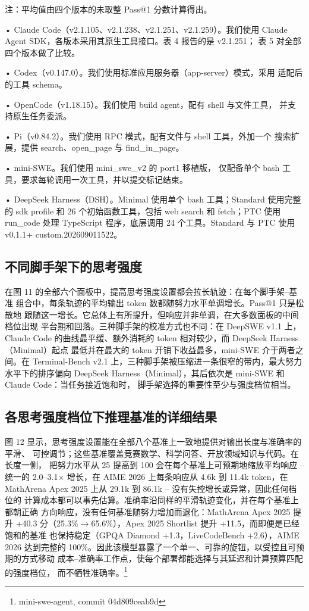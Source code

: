 \documentclass[
  10
]{article}
\begin{document}
注：平均值由四个版本的未取整 Pass@1 分数计算得出。

• Claude Code（v2.1.105、v2.1.238、v2.1.251、v2.1.259）。我们使用
Claude Agent SDK，各版本采用其原生工具接口。表 4 报告的是 v2.1.251；
表 5 对全部四个版本做了比较。

• Codex（v0.147.0）。我们使用标准应用服务器（app-server）模式，采用
适配后的工具 schema。

• OpenCode（v1.18.15）。我们使用 build agent，配有 shell 与文件工具，
并支持原生任务委派。

• Pi（v0.84.2）。我们使用 RPC 模式，配有文件与 shell 工具，外加一个
搜索扩展，提供 search、open\_page 与 find\_in\_page。

• mini-SWE。我们使用 mini\_swe\_v2 的 port1 移植版，
仅配备单个 bash 工具，要求每轮调用一次工具，并以提交标记结束。

• DeepSeek Harness（DSH）。Minimal 使用单个 bash 工具；Standard 使用完整的
sdk profile 和 26 个初始函数工具，包括 web search 和 fetch；PTC 使用
run\_code 处理 TypeScript 程序，底层调用 24 个工具。Standard 与 PTC 使用
v0.1.1+ custom.202609011522。
\subsection{不同脚手架下的思考强度}\label{b.2.-reasoning-efforts-across-scaffolds}

在图 11 的全部六个面板中，提高思考强度设置都会拉长轨迹：在每个脚手架--基准
组合中，每条轨迹的平均输出 token 数都随努力水平单调增长。Pass@1 只是松散地
跟随这一增长。它总体上有所提升，但响应并非单调，在大多数面板的中间档位出现
平台期和回落。三种脚手架的校准方式也不同：在 DeepSWE v1.1 上，Claude Code
的曲线最平缓、额外消耗的 token 相对较少，而 DeepSeek Harness（Minimal）起点
最低并在最大的 token 开销下收益最多，mini-SWE 介于两者之间。在 Terminal-Bench
v2.1 上，三种脚手架被压缩进一条很窄的带内，最大努力水平下的排序偏向 DeepSeek
Harness（Minimal），其后依次是 mini-SWE 和 Claude Code：当任务接近饱和时，
脚手架选择的重要性至少与强度档位相当。

\subsection{各思考强度档位下推理基准的详细结果}\label{b.3.-detailed-results-of-reasoning-benchmarks-across-reasoning-efforts}

图 12 显示，思考强度设置能在全部八个基准上一致地提供对输出长度与准确率的平滑、
可控调节；这些基准覆盖竞赛数学、科学问答、开放领域知识与代码。在长度一侧，
把努力水平从 25 提高到 100 会在每个基准上可预期地缩放平均响应 -- 统一的
2.0--3.1$\times$ 增长，在 AIME 2026 上每条响应从 4.6k 到 11.4k token，在
MathArena Apex 2025 上从 29.1k 到 86.1k -- 没有失控增长或异常，因此任何档位的
计算成本都可以事先估算。准确率沿同样的平滑轨迹变化，并在每个基准上都朝正确
方向响应，没有任何基准随努力增加而退化：MathArena Apex 2025 提升 +40.3
分（25.3\%$\to$65.6\%），Apex 2025 Shortlist 提升 +11.5，而即便是已经饱和的基准
也保持稳定（GPQA Diamond +1.3，LiveCodeBench +2.6），AIME 2026 达到完整的
100\%。因此该模型暴露了一个单一、可靠的旋钮，以受控且可预期的方式移动
成本--准确率工作点，使每个部署都能选择与其延迟和计算预算匹配的强度档位，
而不牺牲准确率。\footnote{mini-swe-agent, commit 04d809ceab9d}
\end{document}
